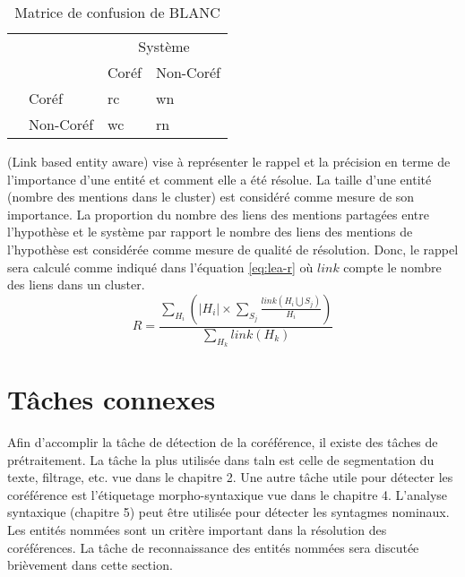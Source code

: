 \documentclass{KodeBook}
\begin{document}
\begin{table}[ht]
	\centering 
	\begin{tabular}{llll}
		\cline{3-4}\noalign{\vskip\doublerulesep
			\vskip-\arrayrulewidth}\cline{3-4}
		&& \multicolumn{2}{c}{Système} \\
		\cline{3-4}
	    && Coréf & Non-Coréf  \\
	    \cline{1-2}\noalign{\vskip\doublerulesep
	    	\vskip-\arrayrulewidth}\hline
	    
	\multirow{2}{*}{Hypothèse} & Coréf & rc & wn \\
	                       & Non-Coréf & wc & rn \\
	   \hline\hline
	\end{tabular}
	\caption[Matrice de confusion de BLANC]{Matrice de confusion de BLANC \cite{2011-recasens-hovy}}
	\label{tab:blanc-confusion}
\end{table}

 (Link based entity aware) vise à représenter le rappel et la précision en terme de l'importance d'une entité et comment elle a été résolue. 
La taille d'une entité (nombre des mentions dans le cluster) est considéré comme mesure de son importance. 
La proportion du nombre des liens des mentions partagées entre l'hypothèse et le système par rapport le nombre des liens des mentions de l'hypothèse est considérée comme mesure de qualité de résolution. 
Donc, le rappel sera calculé comme indiqué dans l'équation \ref{eq:lea-r} où $link$ compte le nombre des liens dans un cluster.
\begin{equation}\label{eq:lea-r}
R = \frac{\sum_{H_i} (|H_i| \times \sum_{S_j} \frac{link(H_i \bigcup S_j)}{H_i})}{\sum_{H_k} link(H_k)}
\end{equation}

\section{Tâches connexes}

Afin d'accomplir la tâche de détection de la coréférence, il existe des tâches de prétraitement. 
La tâche la plus utilisée dans \ac{taln} est celle de segmentation du texte, filtrage, etc. vue dans le chapitre 2. 
Une autre tâche utile pour détecter les coréférence est l'étiquetage morpho-syntaxique vue dans le chapitre 4.
L'analyse syntaxique (chapitre 5) peut être utilisée pour détecter les syntagmes nominaux. 
Les entités nommées sont un critère important dans la résolution des coréférences.
La tâche de reconnaissance des entités nommées sera discutée brièvement dans cette section.
\end{document}
